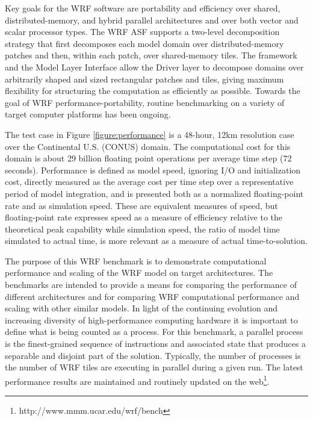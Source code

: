 Key goals for the WRF software are portability and efficiency over
shared, distributed-memory, and hybrid parallel architectures and over
both vector and scalar processor types. The WRF ASF supports a
two-level decomposition strategy that first decomposes each model
domain over distributed-memory patches and then, within each patch,
over shared-memory tiles. The framework and the Model Layer Interface
allow the Driver layer to decompose domains over arbitrarily shaped and
sized rectangular patches and tiles, giving maximum flexibility for
structuring the computation as efficiently as possible. Towards the
goal of WRF performance-portability, routine benchmarking on a variety
of target computer platforms has been ongoing.

The test case in Figure \ref{figure:performance} is a 48-hour, 12km resolution
case over the Continental U.S. (CONUS) domain.  The computational cost
for this domain is about 29 billion floating point operations per
average time step (72 seconds). Performance is defined as model speed,
ignoring I/O and initialization cost, directly measured as the average
cost per time step over a representative period of model integration,
and is presented both as a normalized floating-point rate and as
simulation speed. These are equivalent measures of speed, but
floating-point rate expresses speed as a measure of efficiency relative
to the theoretical peak capability while simulation speed, the ratio of
model time simulated to actual time, is more relevant as a measure of
actual time-to-solution.

The purpose of this WRF benchmark is to demonstrate computational
performance and scaling of the WRF model on target architectures. The
benchmarks are intended to provide a means for comparing the
performance of different architectures and for comparing WRF
computational performance and scaling with other similar models.  In
light of the continuing evolution and increasing diversity of
high-performance computing hardware it is important to define what is
being counted as a process.  For this benchmark, a parallel process is
the finest-grained sequence of instructions and associated state that
produces a separable and disjoint part of the solution.  Typically, the
number of processes is the number of WRF tiles are executing in
parallel during a given run.
The latest performance results are maintained and routinely updated on
the web\footnote{http://www.mmm.ucar.edu/wrf/bench}.


